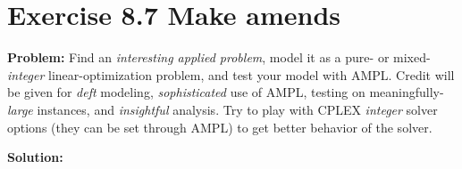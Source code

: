 \section{Exercise 8.7 Make amends}
\textbf{Problem:} Find an \textit{interesting applied problem}, model it as a pure- or mixed-\textit{integer} linear-optimization problem, and test your model with AMPL. Credit will be given for \textit{deft} modeling, \textit{sophisticated} use of AMPL, testing on meaningfully-\textit{large} instances, and \textit{insightful} analysis. Try to play with CPLEX \textit{integer} solver options (they can be set through AMPL) to get better behavior of the solver.

\textbf{Solution:} 